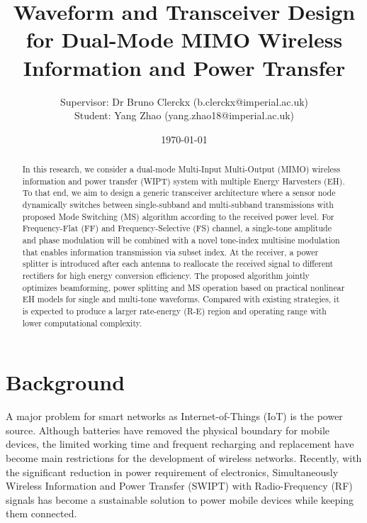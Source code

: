 \documentclass[conference]{IEEEtran}
\title{Waveform and Transceiver Design for Dual-Mode MIMO Wireless Information and Power Transfer}
\author{Supervisor: Dr Bruno Clerckx (b.clerckx@imperial.ac.uk)
    \\
    Student: Yang Zhao (yang.zhao18@imperial.ac.uk)}
\date{\today}
\begin{document}
\maketitle

\begin{abstract}
  In this research, we consider a dual-mode Multi-Input Multi-Output (MIMO) wireless information and power transfer (WIPT) system with multiple Energy Harvesters (EH). To that end, we aim to design a generic transceiver architecture where a sensor node dynamically switches between single-subband and multi-subband transmissions with proposed Mode Switching (MS) algorithm according to the received power level. For Frequency-Flat (FF) and Frequency-Selective (FS) channel, a single-tone amplitude and phase modulation will be combined with a novel tone-index multisine modulation that enables information transmission via subset index. At the receiver, a power splitter is introduced after each antenna to reallocate the received signal to different rectifiers for high energy conversion efficiency. The proposed algorithm jointly optimizes beamforming, power splitting and MS operation based on practical nonlinear EH models for single and multi-tone waveforms. Compared with existing strategies, it is expected to produce a larger rate-energy (R-E) region and operating range with lower computational complexity.
\end{abstract}

\section{Background}
A major problem for smart networks as Internet-of-Things (IoT) is the power source. Although batteries have removed the physical boundary for mobile devices, the limited working time and frequent recharging and replacement have become main restrictions for the development of wireless networks. Recently, with the significant reduction in power requirement of electronics, Simultaneously Wireless Information and Power Transfer (SWIPT) with Radio-Frequency (RF) signals has become a sustainable solution to power mobile devices while keeping them connected.
\end{document}
